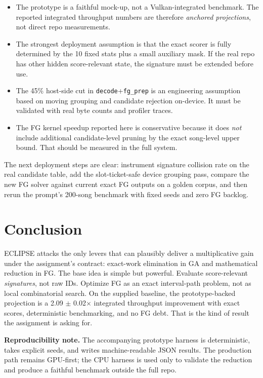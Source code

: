 \documentclass[11pt]{article}
\newcommand{\method}{ECLIPSE}
\begin{document}
\begin{itemize}
    \item The prototype is a faithful mock-up, not a Vulkan-integrated benchmark. The reported integrated throughput numbers are therefore \emph{anchored projections}, not direct repo measurements.
    \item The strongest deployment assumption is that the exact scorer is fully determined by the 10 fixed stats plus a small auxiliary mask. If the real repo has other hidden score-relevant state, the signature must be extended before use.
    \item The 45\% host-side cut in \texttt{decode}+\texttt{fg\_prep} is an engineering assumption based on moving grouping and candidate rejection on-device. It must be validated with real byte counts and profiler traces.
    \item The FG kernel speedup reported here is conservative because it does \emph{not} include additional candidate-level pruning by the exact song-level upper bound. That should be measured in the full system.
\end{itemize}

The next deployment steps are clear: instrument signature collision rate on the real candidate table, add the slot-ticket-safe device grouping pass, compare the new FG solver against current exact FG outputs on a golden corpus, and then rerun the prompt's 200-song benchmark with fixed seeds and zero FG backlog.

\section{Conclusion}

\method{} attacks the only levers that can plausibly deliver a multiplicative gain under the assignment's contract: exact-work elimination in GA and mathematical reduction in FG. The base idea is simple but powerful. Evaluate score-relevant \emph{signatures}, not raw IDs. Optimize FG as an exact interval-path problem, not as local combinatorial search. On the supplied baseline, the prototype-backed projection is a 2.09 $\pm$ 0.02$\times$ integrated throughput improvement with exact scores, deterministic benchmarking, and no FG debt. That is the kind of result the assignment is asking for.

\vfill
\small
\textbf{Reproducibility note.} The accompanying prototype harness is deterministic, takes explicit seeds, and writes machine-readable JSON results. The production path remains GPU-first; the CPU harness is used only to validate the reduction and produce a faithful benchmark outside the full repo.
\end{document}
